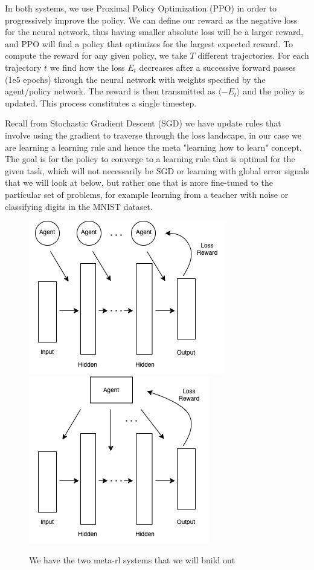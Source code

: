 \documentclass{article}
\begin{document}
In both systems, we use Proximal Policy Optimization (PPO) in order to progressively improve the policy. We can define
our reward as the negative loss for the neural network, thus having smaller absolute loss will be a larger reward, and
PPO will find a policy that optimizes for the largest expected reward. To compute the reward for any given policy, we 
take $T$ different trajectories. For each trajectory $t$ we find how the loss $E_t$ 
decreases after a successive forward passes (1e5 epochs) through the neural 
network with weights specified by the agent/policy network. The reward is 
then transmitted as $\langle - E_t \rangle$ and the policy is updated. This process constitutes a single timestep.

Recall from Stochastic Gradient Descent (SGD) we have update rules that involve using the gradient to traverse through the loss landscape,
in our case we are learning a learning rule and hence the meta "learning how to learn" concept. The goal is for
the policy to converge to a learning rule that is optimal for the given task, which will not necessarily be SGD
or learning with global error signals that we will look at below, but rather one that is more fine-tuned to the particular
set of problems, for example learning from a teacher with noise or classifying digits in the MNIST dataset.

\begin{figure}
  \centering
  \includegraphics[scale=0.6]{marlnn} \includegraphics[scale=0.6]{singleagent}
  \caption{We have the two meta-rl systems that we will build out \label{fig:meta-rl}}
\end{figure}
 
\end{document}
